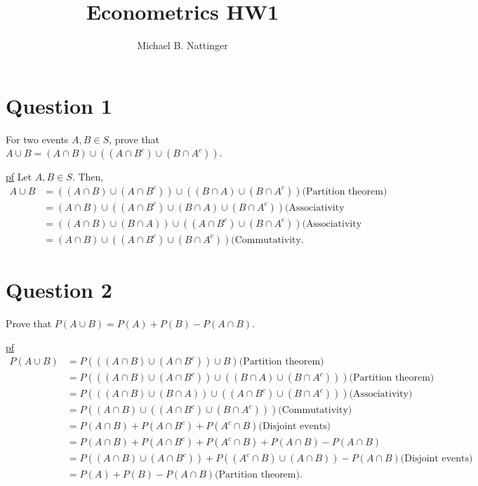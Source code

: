 \documentclass[11pt]{article} %
\title{Econometrics HW1}
\author{Michael B. Nattinger}
\begin{document}
\maketitle

\section{Question 1}
For two events $A,B \in S$, prove that $A \cup B = (A \cap B) \cup ((A \cap B^{c}) \cup (B \cap A^{c}))$.

\underline{pf} Let $A,B \in S.$ Then, 
\begin{align*}
A \cup B &= \left((A \cap B) \cup (A \cap B^{c}) \right) \cup \left( (B \cap A) \cup (B \cap A^{c}) \right)  \text{(Partition theorem)}\\
	     &= (A \cap B) \cup \left( (A \cap B^{c}) \cup (B \cap A) \cup (B \cap A^{c}) \right)  \text{(Associativity} \\
	     &= \left( (A \cap B) \cup  (B \cap A) \right) \cup \left( (A \cap B^{c}) \cup (B \cap A^{c}) \right)  \text{(Associativity}\\
	     &= (A \cap B) \cup \left( (A \cap B^{c}) \cup (B \cap A^{c}) \right)  \text{(Commutativity}.
\end{align*}

\section{Question 2}
Prove that $P(A \cup B) = P(A) + P(B) - P(A \cap B).$

\underline{pf} 
\begin{align*}
P(A \cup B) &= P(( (A \cap B) \cup (A \cap B^{c})) \cup B)  \text{(Partition theorem)}\\
 		 &= P(( (A \cap B) \cup (A \cap B^{c})) \cup ((B \cap A) \cup ( B \cap A^{c})))  \text{(Partition theorem)}\\
		 &= P(((A \cap B) \cup (B \cap A)) \cup ( (A \cap B^{c}) \cup (B \cap A^{c}))) \text{(Associativity)} \\
		 &= P((A \cap B) \cup ((A \cap B^{c}) \cup (B \cap A^{c})))  \text{(Commutativity)}\\
		 &= P(A \cap B)+P(A \cap B^{c})+P(A^{c} \cap B)  \text{(Disjoint events)}\\
		 &= P(A \cap B)+P(A \cap B^{c})+P(A^{c} \cap B) + P(A \cap B) - P(A \cap B) \\
		 &= P((A \cap B) \cup (A \cap B^{c}))+P((A^{c} \cap B) \cup (A \cap B)) - P(A \cap B) \text{(Disjoint events)} \\
		 &= P(A)+P(B) - P(A \cap B) \text{(Partition theorem)}.
\end{align*}
\end{document}

